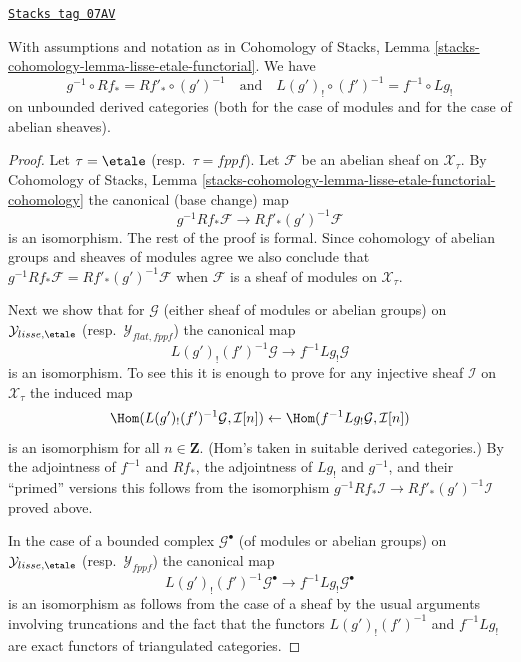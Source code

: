 \begin{lemma}
\label{stacks-perfect-lemma-lisse-etale-functorial-derived}
\href{https://stacks.math.columbia.edu/tag/07AV}{\texttt{Stacks tag 07AV}}

With assumptions and notation as in
Cohomology of Stacks,
Lemma \ref{stacks-cohomology-lemma-lisse-etale-functorial}.
We have
$$
g^{-1} \circ Rf_* = Rf'_* \circ (g')^{-1}
\quad\text{and}\quad
L(g')_! \circ (f')^{-1} = f^{-1} \circ Lg_!
$$
on unbounded derived categories
(both for the case of modules and for the case of abelian sheaves).
\end{lemma}

\begin{proof}
Let $\tau = \etale$ (resp.\ $\tau = fppf$). Let $\mathcal{F}$ be an abelian
sheaf on $\mathcal{X}_\tau$. By Cohomology of Stacks, Lemma
\ref{stacks-cohomology-lemma-lisse-etale-functorial-cohomology}
the canonical (base change) map
$$
g^{-1}Rf_*\mathcal{F} \longrightarrow Rf'_*(g')^{-1}\mathcal{F}
$$
is an isomorphism. The rest of the proof is formal. Since cohomology of
abelian groups and sheaves of modules agree we also conclude that
$g^{-1} Rf_*\mathcal{F} = Rf'_* (g')^{-1}\mathcal{F}$ when $\mathcal{F}$
is a sheaf of modules on $\mathcal{X}_\tau$.

\medskip\noindent
Next we show that for $\mathcal{G}$ (either sheaf of modules
or abelian groups) on
$\mathcal{Y}_{lisse,\etale}$ (resp.\ $\mathcal{Y}_{flat,fppf}$)
the canonical map
$$
L(g')_!(f')^{-1}\mathcal{G} \to f^{-1}Lg_!\mathcal{G}
$$
is an isomorphism. To see this it is enough to prove for any
injective sheaf $\mathcal{I}$ on $\mathcal{X}_\tau$ the induced map
$$
\Hom(L(g')_!(f')^{-1}\mathcal{G}, \mathcal{I}[n])
\leftarrow
\Hom(f^{-1}Lg_!\mathcal{G}, \mathcal{I}[n])
$$
is an isomorphism for all $n \in \mathbf{Z}$. (Hom's taken
in suitable derived categories.) By the adjointness of
$f^{-1}$ and $Rf_*$, the adjointness of $Lg_!$ and $g^{-1}$, and
their ``primed'' versions this follows from the isomorphism
$g^{-1} Rf_*\mathcal{I} \to Rf'_* (g')^{-1}\mathcal{I}$ proved above.

\medskip\noindent
In the case of a bounded complex $\mathcal{G}^\bullet$
(of modules or abelian groups) on
$\mathcal{Y}_{lisse,\etale}$ (resp.\ $\mathcal{Y}_{fppf}$)
the canonical map
\begin{equation}
\label{equation-to-show}
L(g')_!(f')^{-1}\mathcal{G}^\bullet \to f^{-1}Lg_!\mathcal{G}^\bullet
\end{equation}
is an isomorphism as follows from the case of a sheaf by the usual arguments
involving truncations and the fact that the functors
$L(g')_!(f')^{-1}$ and $f^{-1}Lg_!$ are exact functors of
triangulated categories.


\end{proof}
